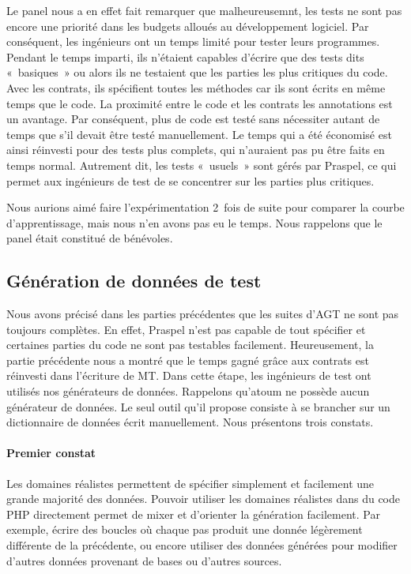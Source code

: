 Le panel nous a en effet fait remarquer que malheureusemnt, les tests ne sont
pas encore une priorité dans les budgets alloués au développement logiciel. Par
conséquent, les ingénieurs ont un temps limité pour tester leurs programmes.
Pendant le temps imparti, ils n'étaient capables d'écrire que des tests dits
«~basiques~» ou alors ils ne testaient que les parties les plus critiques du
code. Avec les contrats, ils spécifient toutes les méthodes car ils sont écrits
en même temps que le code. La proximité entre le code et les contrats \via les
annotations est un avantage. Par conséquent, plus de code est testé sans
nécessiter autant de temps que s'il devait être testé manuellement. Le temps qui
a été économisé est ainsi réinvesti pour des tests plus complets, qui n'auraient
pas pu être faits en temps normal. Autrement dit, les tests «~usuels~» sont
gérés par Praspel, ce qui permet aux ingénieurs de test de se concentrer sur les
parties plus critiques.

Nous aurions aimé faire l'expérimentation 2~fois de suite pour comparer la
courbe d'apprentissage, mais nous n'en avons pas eu le temps. Nous rappelons que
le panel était constitué de bénévoles.

\subsection{Génération de données de test}
\label{subsection:experimentation:data}


Nous avons précisé dans les parties précédentes que les suites d'AGT ne sont pas
toujours complètes. En effet, Praspel n'est pas capable de tout spécifier et
certaines parties du code ne sont pas testables facilement. Heureusement, la
partie précédente nous a montré que le temps gagné grâce aux contrats est
réinvesti dans l'écriture de MT. Dans cette étape, les ingénieurs de test ont
utilisés nos générateurs de données. Rappelons qu'atoum ne possède aucun
générateur de données. Le seul outil qu'il propose consiste à se brancher sur un
dictionnaire de données écrit manuellement. Nous présentons trois constats.

\paragraph{Premier constat} Les domaines réalistes permettent de spécifier
simplement et facilement une grande majorité des données. Pouvoir utiliser les
domaines réalistes dans du code PHP directement permet de mixer et d'orienter la
génération facilement. Par exemple, écrire des boucles où chaque pas produit une
donnée légèrement différente de la précédente, ou encore utiliser des données
générées pour modifier d'autres données provenant de bases ou d'autres sources.

